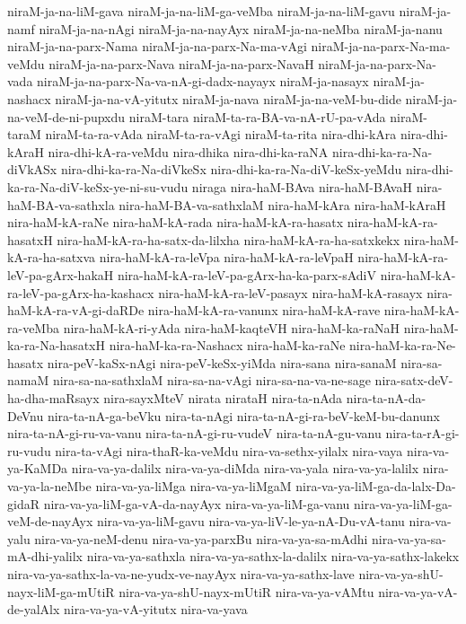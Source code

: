 {niraM-ja-na-liM-gava
niraM-ja-na-liM-ga-veMba
niraM-ja-na-liM-gavu
niraM-ja-namf
niraM-ja-na-nAgi
niraM-ja-na-nayAyx
niraM-ja-na-neMba
niraM-ja-nanu
niraM-ja-na-parx-Nama
niraM-ja-na-parx-Na-ma-vAgi
niraM-ja-na-parx-Na-ma-veMdu
niraM-ja-na-parx-Nava
niraM-ja-na-parx-NavaH
niraM-ja-na-parx-Na-vada
niraM-ja-na-parx-Na-va-nA-gi-dadx-nayayx
niraM-ja-nasayx
niraM-ja-nashacx
niraM-ja-na-vA-yitutx
niraM-ja-nava
niraM-ja-na-veM-bu-dide
niraM-ja-na-veM-de-ni-pupxdu
niraM-tara
niraM-ta-ra-BA-va-nA-rU-pa-vAda
niraM-taraM
niraM-ta-ra-vAda
niraM-ta-ra-vAgi
niraM-ta-rita
nira-dhi-kAra
nira-dhi-kAraH
nira-dhi-kA-ra-veMdu
nira-dhika
nira-dhi-ka-raNA
nira-dhi-ka-ra-Na-diVkASx
nira-dhi-ka-ra-Na-diVkeSx
nira-dhi-ka-ra-Na-diV-keSx-yeMdu
nira-dhi-ka-ra-Na-diV-keSx-ye-ni-su-vudu
niraga
nira-haM-BAva
nira-haM-BAvaH
nira-haM-BA-va-sathxla
nira-haM-BA-va-sathxlaM
nira-haM-kAra
nira-haM-kAraH
nira-haM-kA-raNe
nira-haM-kA-rada
nira-haM-kA-ra-hasatx
nira-haM-kA-ra-hasatxH
nira-haM-kA-ra-ha-satx-da-lilxha
nira-haM-kA-ra-ha-satxkekx
nira-haM-kA-ra-ha-satxva
nira-haM-kA-ra-leVpa
nira-haM-kA-ra-leVpaH
nira-haM-kA-ra-leV-pa-gArx-hakaH
nira-haM-kA-ra-leV-pa-gArx-ha-ka-parx-sAdiV
nira-haM-kA-ra-leV-pa-gArx-ha-kashacx
nira-haM-kA-ra-leV-pasayx
nira-haM-kA-rasayx
nira-haM-kA-ra-vA-gi-daRDe
nira-haM-kA-ra-vanunx
nira-haM-kA-rave
nira-haM-kA-ra-veMba
nira-haM-kA-ri-yAda
nira-haM-kaqteVH
nira-haM-ka-raNaH
nira-haM-ka-ra-Na-hasatxH
nira-haM-ka-ra-Nashacx
nira-haM-ka-raNe
nira-haM-ka-ra-Ne-hasatx
nira-peV-kaSx-nAgi
nira-peV-keSx-yiMda
nira-sana
nira-sanaM
nira-sa-namaM
nira-sa-na-sathxlaM
nira-sa-na-vAgi
nira-sa-na-va-ne-sage
nira-satx-deV-ha-dha-maRsayx
nira-sayxMteV
nirata
nirataH
nira-ta-nAda
nira-ta-nA-da-DeVnu
nira-ta-nA-ga-beVku
nira-ta-nAgi
nira-ta-nA-gi-ra-beV-keM-bu-danunx
nira-ta-nA-gi-ru-va-vanu
nira-ta-nA-gi-ru-vudeV
nira-ta-nA-gu-vanu
nira-ta-rA-gi-ru-vudu
nira-ta-vAgi
nira-thaR-ka-veMdu
nira-va-sethx-yilalx
nira-vaya
nira-va-ya-KaMDa
nira-va-ya-dalilx
nira-va-ya-diMda
nira-va-yala
nira-va-ya-lalilx
nira-va-ya-la-neMbe
nira-va-ya-liMga
nira-va-ya-liMgaM
nira-va-ya-liM-ga-da-lalx-Da-gidaR
nira-va-ya-liM-ga-vA-da-nayAyx
nira-va-ya-liM-ga-vanu
nira-va-ya-liM-ga-veM-de-nayAyx
nira-va-ya-liM-gavu
nira-va-ya-liV-le-ya-nA-Du-vA-tanu
nira-va-yalu
nira-va-ya-neM-denu
nira-va-ya-parxBu
nira-va-ya-sa-mAdhi
nira-va-ya-sa-mA-dhi-yalilx
nira-va-ya-sathxla
nira-va-ya-sathx-la-dalilx
nira-va-ya-sathx-lakekx
nira-va-ya-sathx-la-va-ne-yudx-ve-nayAyx
nira-va-ya-sathx-lave
nira-va-ya-shU-nayx-liM-ga-mUtiR
nira-va-ya-shU-nayx-mUtiR
nira-va-ya-vAMtu
nira-va-ya-vA-de-yalAlx
nira-va-ya-vA-yitutx
nira-va-yava
}
